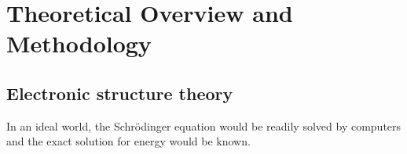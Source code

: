 




    


    
    





\chapter{Theoretical Overview and Methodology} %


\section{Electronic structure theory}
In an ideal world, the Schrödinger equation would be readily solved by computers and the exact solution for energy would be known. 
    

